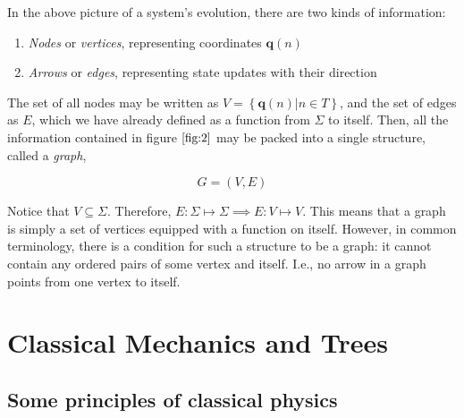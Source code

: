 \documentclass[12 pt]{article}
\begin{document}
In the above picture of a system's evolution, there are two kinds of information:

\begin{enumerate}
  \item \emph{Nodes} or \emph{vertices}, representing coordinates $\pmb{q} \left( n \right)$

  \item \emph{Arrows} or \emph{edges}, representing state updates with their direction
\end{enumerate}

The set of all nodes may be written as $V = \left\{ \pmb{q} \left( n \right) \vert n \in T \right\}$, and the set of edges as $E$, which we have already defined as a function from $\Sigma$ to itself. Then, all the information contained in figure $\ref{fig:2}$ may be packed into a single structure, called a \emph{graph},

$$G = \left( V, E \right)$$

Notice that $V \subseteq \Sigma$. Therefore, $E : \Sigma \mapsto \Sigma \implies E : V \mapsto V$. This means that a graph is simply a set of vertices equipped with a function on itself. However, in common terminology, there is a condition for such a structure to be a graph: it cannot contain any ordered pairs of some vertex and itself. I.e., no arrow in a graph points from one vertex to itself.

\clearpage

\section{Classical Mechanics and Trees}

\subsection{Some principles of classical physics}
\end{document}
